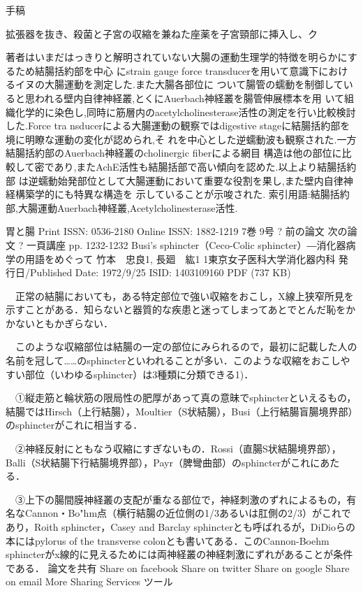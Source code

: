 手稿

拡張器を抜き、殺菌と子宮の収縮を兼ねた座薬を子宮頸部に挿入し、ク







著者はいまだはっきりと解明されていない大腸の運動生理学的特徴を明らかにするため結腸括約部を中心
にstrain gauge force transducerを用いて意識下におけるイヌの大腸運動を測定した.また大腸各部位に
ついて腸管の蠕動を制御していると思われる壁内自律神経叢,とくにAuerbach神経叢を腸管伸展標本を用
いて組織化学的に染色し,同時に筋層内のacetylcholinesterase活性の測定を行い比較検討した.Force tra
nsducerによる大腸運動の観察ではdigestive stageに結腸括約部を境に明瞭な運動の変化が認められ,そ
れを中心とした逆蠕動波も観察された.一方結腸括約部のAuerbach神経叢のcholinergic fiberによる網目
構造は他の部位に比較して密であり,またAchE活性も結腸括部で高い傾向を認めた.以上より結腸括約部
は逆蠕動始発部位として大腸運動において重要な役割を果し,また壁内自律神経構築学的にも特異な構造を
示していることが示唆された.
索引用語:結腸括約部,大腸運動Auerbach神経叢,Acetylcholinesterase活性.

胃と腸
Print ISSN: 0536-2180 Online ISSN: 1882-1219
7巻 9号
? 前の論文
次の論文 ?
一頁講座
pp. 1232-1232
Busi's sphincter（Ceco-Colic sphincter）―消化器病学の用語をめぐって
竹本　忠良1, 長廻　紘1
1東京女子医科大学消化器内科
発行日/Published Date: 1972/9/25
ISID: 1403109160
PDF (737 KB)

　正常の結腸においても，ある特定部位で強い収縮をおこし，X線上狭窄所見を示すことがある．知らないと器質的な疾患と迷ってしまってあとでとんだ恥をかかないともかぎらない．

　このような収縮部位は結腸の一定の部位にみられるので，最初に記載した人の名前を冠して……のsphincterといわれることが多い．このような収縮をおこしやすい部位（いわゆるsphincter）は3種類に分類できる1)．

　①縦走筋と輪状筋の限局性の肥厚があって真の意昧でsphincterといえるもの，結腸ではHirsch（上行結腸），Moultier（S状結腸），Busi（上行結腸盲腸境界部）のsphincterがこれに相当する．

　②神経反射にともなう収縮にすぎないもの．Rossi（直腸S状結腸境界部），Balli（S状結腸下行結腸境界部），Payr（脾彎曲部）のsphincterがこれにあたる．

　③上下の腸間膜神経叢の支配が重なる部位で，神経刺激のずれによるもの，有名なCannon・Bo"hm点（横行結腸の近位側の1/3あるいは肛側の2/3）がこれであり，Roith sphincter，Casey and Barclay sphincterとも呼ばれるが，DiDioらの本にはpylorus of the transverse colonとも書いてある．このCannon-Boehm sphincterがx線的に見えるためには両神経叢の神経刺激にずれがあることが条件である．
論文を共有
Share on facebook Share on twitter Share on google Share on email More Sharing Services
ツール



